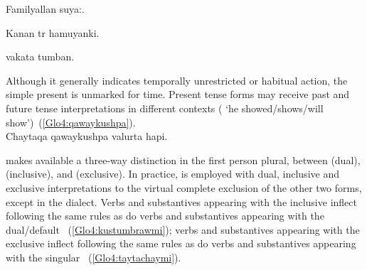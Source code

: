 %
{Familyallan  suya:.}%
{}%
{}{}%

%
{Kanan tr hamuyanki.}%
{}%
{}{}%

%
{ vakata tumban.}%
{}%
{}{}%

\noindent
Although it generally indicates temporally unrestricted or habitual action, the simple present is unmarked for time. Present tense forms may receive past and future tense interpretations in different contexts ( ‘he showed/shows/will show’)~(\ref{Glo4:qawaykushpa}).\\

%
{Chaytaqa qawaykushpa valurta hapi.}%
{}%
{}{}%

\noindent
\SYQ{} makes available a three-way distinction in the first person plural, between  (dual),  (inclusive), and  (exclusive). In practice,  is employed with dual, inclusive and exclusive interpretations to the virtual complete exclusion of the other two forms, except in the \CH{} dialect. Verbs and substantives appearing with the inclusive  inflect following the same rules as do verbs and substantives appearing with the dual/default ~(\ref{Glo4:kustumbrawmi}); verbs and substantives appearing with the exclusive  inflect following the same rules as do verbs and substantives appearing with the singular ~(\ref{Glo4:taytachaymi}).\\

